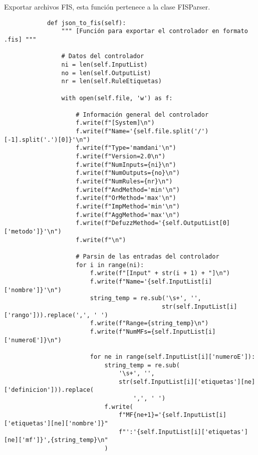     \begin{longlisting}
        \caption[Exportar archivos FIS]{Exportar archivos FIS, esta función pertenece a la clase FISParser.}
        \label{code:anexoF3}				
        \begin{verbatim}
            def json_to_fis(self):
                """ [Función para exportar el controlador en formato .fis] """

                # Datos del controlador
                ni = len(self.InputList)
                no = len(self.OutputList)
                nr = len(self.RuleEtiquetas)

                with open(self.file, 'w') as f:

                    # Información general del controlador
                    f.write(f"[System]\n")
                    f.write(f"Name='{self.file.split('/')[-1].split('.')[0]}'\n")
                    f.write(f"Type='mamdani'\n")
                    f.write(f"Version=2.0\n")
                    f.write(f"NumInputs={ni}\n")
                    f.write(f"NumOutputs={no}\n")
                    f.write(f"NumRules={nr}\n")
                    f.write(f"AndMethod='min'\n")
                    f.write(f"OrMethod='max'\n")
                    f.write(f"ImpMethod='min'\n")
                    f.write(f"AggMethod='max'\n")
                    f.write(f"DefuzzMethod='{self.OutputList[0]['metodo']}'\n")
                    f.write(f"\n")

                    # Parsin de las entradas del controlador
                    for i in range(ni):
                        f.write(f"[Input" + str(i + 1) + "]\n")
                        f.write(f"Name='{self.InputList[i]['nombre']}'\n")
                        string_temp = re.sub('\s+', '',
                                            str(self.InputList[i]['rango'])).replace(',', ' ')
                        f.write(f"Range={string_temp}\n")
                        f.write(f"NumMFs={self.InputList[i]['numeroE']}\n")

                        for ne in range(self.InputList[i]['numeroE']):
                            string_temp = re.sub(
                                '\s+', '',
                                str(self.InputList[i]['etiquetas'][ne]['definicion'])).replace(
                                    ',', ' ')
                            f.write(
                                f"MF{ne+1}='{self.InputList[i]['etiquetas'][ne]['nombre']}"
                                f"':'{self.InputList[i]['etiquetas'][ne]['mf']}',{string_temp}\n"
                            )


\end{verbatim}
\end{longlisting}
